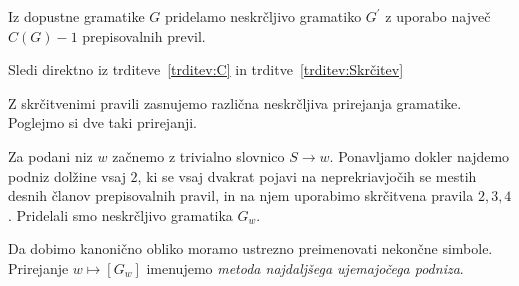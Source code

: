 \documentclass[fin1, tisk]{fmfdelo}
\theoremstyle{definition}
\begin{document}
\begin{izrek}
    Iz dopustne gramatike $G$ pridelamo neskrčljivo gramatiko $G^\prime$ z uporabo največ 
    $C(G) - 1$ prepisovalnih previl.
\end{izrek}

\begin{dokaz}
    Sledi direktno iz trditeve~\ref{trditev:C} in trditve~\ref{trditev:Skrčitev}
\end{dokaz}

Z skrčitvenimi pravili zasnujemo različna neskrčljiva prirejanja gramatike. Poglejmo si dve taki
prirejanji.

\begin{definicija}
    Za podani niz $w$ začnemo z trivialno slovnico $S \rightarrow w$. 
    Ponavljamo dokler najdemo podniz dolžine vsaj $2$, ki se vsaj dvakrat pojavi na 
    neprekriavjočih se mestih desnih članov prepisovalnih pravil, in na njem uporabimo skrčitvena
    pravila $2,3,4$. Pridelali smo neskrčljivo gramatika $G_w$. 
    
    Da dobimo kanonično obliko moramo ustrezno preimenovati nekončne simbole. 
    Prirejanje $w \mapsto [G_w]$ imenujemo \emph{metoda najdaljšega ujemajočega podniza}.
\end{definicija}
\end{document}
